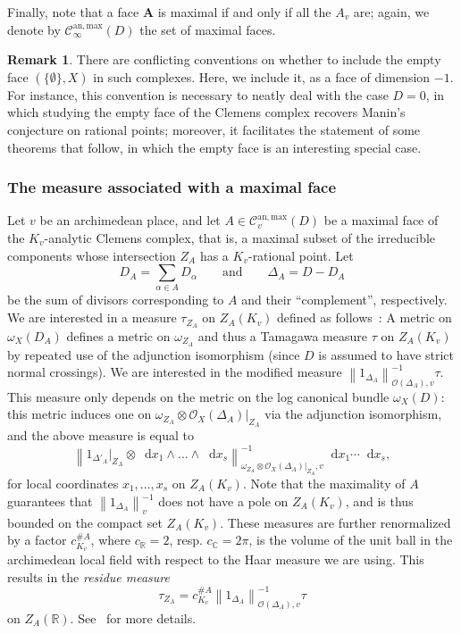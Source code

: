 \documentclass[a4paper, twoside, 10pt]{amsart}
\newcommand*\diff{\mathop{}\!\mathrm{d}}
\newcommand{\uA}{{\boldsymbol{A}}}
\newcommand{\cC}{\mathcal{C}}
\newcommand{\cO}{\mathcal{O}}
\newcommand{\CC}{\mathbb{C}}
\newcommand{\RR}{\mathbb{R}}
\newcommand{\Canmax}{\cC^{\mathrm{an,max}}}
\newcommand{\norm}[1]{\left\lVert#1\right\rVert}
\theoremstyle{definition}
\newtheorem{remark}[theorem]{Remark}
\begin{document}
Finally, note that a face $\uA$ is maximal if and only if all the $A_v$ are; again, we denote by $\Canmax_\infty(D)$ the set of maximal faces.

\begin{remark}
  There are conflicting conventions on whether to include the empty face $(\{\emptyset\}, X)$ in such complexes. 
  Here, we include it, as a face of dimension $-1$. For instance, this convention is necessary to neatly deal with the case $D=0$, in which studying the empty face of the Clemens complex recovers Manin's conjecture on rational points; moreover, it facilitates the statement of some theorems that follow, in which the empty face is an interesting special case.
\end{remark}


\subsubsection{The measure associated with a maximal face}\label{sssec:residue-measure}

Let $v$ be an archimedean place, and let $A\in\Canmax_v(D)$ be a maximal face of the $K_v$-analytic Clemens complex, that is, a maximal subset of the irreducible components whose intersection $Z_A$ has a $K_v$-rational point.
Let
\[
  D_A = \sum_{\alpha \in A} D_\alpha \qquad \text{and} \qquad \Delta_A=D-D_A
\]
be the sum of divisors corresponding to $A$ and their ``complement'', respectively. We are interested in a measure $\tau_{Z_A}$ on $Z_A(K_v)$ defined as follows~\cite[\S\,2.1.12]{MR2740045}: A metric on $\omega_X(D_A)$ defines a metric on $\omega_{Z_A}$ and thus a Tamagawa measure $\tau$ on $Z_A(K_v)$ by repeated use of the adjunction isomorphism (since $D$ is assumed to have strict normal crossings). We are interested in the modified measure
$\norm{1_{\Delta_A}}^{-1}_{\cO(\Delta_A),v}\tau$.
This measure only depends on the metric on the log canonical bundle $\omega_X(D)$: this metric induces one on $\omega_{Z_A} \otimes \cO_X(\Delta_A)|_{Z_A}$ via the adjunction isomorphism, and the above measure is equal to
\[
  \norm{1_{\Delta'_A}\big|_{Z_A} \otimes \diff x_1 \wedge \dots \wedge \diff x_s}^{-1}_{\omega_{Z_A} \otimes \cO_X(\Delta_A)|_{Z_A},v} \diff x_1 \cdots \diff x_s,
\]
for local coordinates $x_1,\dots, x_s$ on $Z_A(K_v)$. Note that the maximality of $A$ guarantees that $\norm{1_{\Delta_A}}_v^{-1}$ does not have a pole on $Z_A(K_v)$, and is thus bounded on the compact set $Z_A(K_v)$.
These measures are further renormalized by a factor $c_{K_v}^{\# A}$, where $c_\RR=2$, resp. $c_\CC=2\pi$, is the volume of the unit ball in the archimedean local field with respect to the Haar measure we are using.
This results in the \emph{residue measure}
\[
  \tau_{Z_A} = c_{K_v}^{\# A} \norm{1_{\Delta_A}}^{-1}_{\cO(\Delta_A),v}\tau
\]
on $Z_A(\RR)$. See~\cite[\S\S\,3.3.1,~4.1]{MR2740045} for more details.
\end{document}

